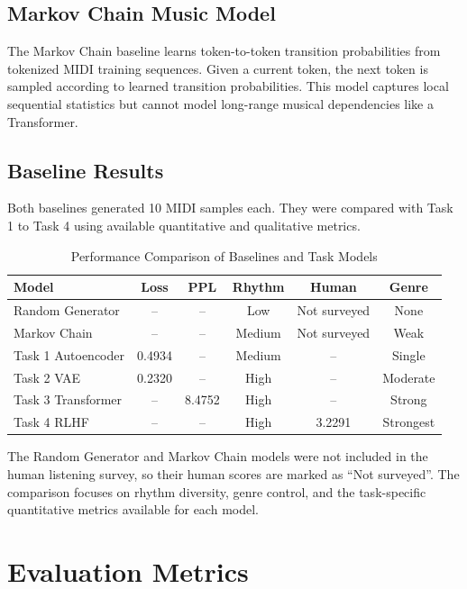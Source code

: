 \documentclass[conference]{IEEEtran}
\begin{document}
\subsection{Markov Chain Music Model}

The Markov Chain baseline learns token-to-token transition probabilities from tokenized MIDI training sequences. Given a current token, the next token is sampled according to learned transition probabilities. This model captures local sequential statistics but cannot model long-range musical dependencies like a Transformer.

\subsection{Baseline Results}

Both baselines generated 10 MIDI samples each. They were compared with Task 1 to Task 4 using available quantitative and qualitative metrics.

\begin{table}[h]
\centering
\caption{Performance Comparison of Baselines and Task Models}
\begin{tabular}{lccccc}
\toprule
Model & Loss & PPL & Rhythm & Human & Genre \\
\midrule
Random Generator & -- & -- & Low & Not surveyed & None \\
Markov Chain & -- & -- & Medium & Not surveyed & Weak \\
Task 1 Autoencoder & 0.4934 & -- & Medium & -- & Single \\
Task 2 VAE & 0.2320 & -- & High & -- & Moderate \\
Task 3 Transformer & -- & 8.4752 & High & -- & Strong \\
Task 4 RLHF & -- & -- & High & 3.2291 & Strongest \\
\bottomrule
\end{tabular}
\end{table}

The Random Generator and Markov Chain models were not included in the human listening survey, so their human scores are marked as ``Not surveyed''. The comparison focuses on rhythm diversity, genre control, and the task-specific quantitative metrics available for each model.

\section{Evaluation Metrics}
\end{document}
